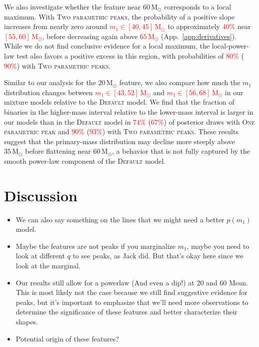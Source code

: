 \documentclass[twocolumn,twocolappendix,linenumbers]{aastex631}
\newcommand{\oneparpeak}{\textsc{One parametric peak}\xspace}
\newcommand{\twoparpeaks}{\textsc{Two parametric peaks}\xspace}
\newcommand{\Msun}{\ensuremath{\mathrm{M}_\odot}\xspace}
\begin{document}
We also investigate whether the feature near $60\,\Msun$ corresponds to a local maximum.
With \twoparpeaks, the probability of a positive slope increases from nearly zero around \textcolor{red}{$m_1 \in [40,45]\,\Msun$} to approximately \textcolor{red}{$40\%$} near \textcolor{red}{$[55,60]\,\Msun$}, before decreasing again above \textcolor{red}{$65\,\Msun$} (App.~\ref{app:derivatives}).
While we do not find conclusive evidence for a local maximum, the local-power-law test also favors a positive excess in this region, with probabilities of \textcolor{red}{$80\%$} (\textcolor{red}{$90\%$}) with \twoparpeaks.

Similar to our analysis for the $20\,\Msun$ feature, we also compare how much the $m_1$ distribution changes between \textcolor{red}{$m_1 \in [43,52]\,\Msun$} and \textcolor{red}{$m_1 \in [56,68]\,\Msun$} in our mixture models relative to the \textsc{Default} model.
We find that the fraction of binaries in the higher-mass interval relative to the lower-mass interval is larger in our models than in the \textsc{Default} model in \textcolor{red}{$74\%$} (\textcolor{red}{$67\%$}) of posterior draws with \oneparpeak and \textcolor{red}{$90\%$} (\textcolor{red}{$93\%$}) with \twoparpeaks.
These results suggest that the primary-mass distribution may decline more steeply above $35\,\Msun$ before flattening near $60\,\Msun$, a behavior that is not fully captured by the smooth power-law component of the \textsc{Default} model.


\section{Discussion}

\begin{itemize}
    \item We can also say something on the lines that we might need a better $p(m_1)$ model.
    \item Maybe the features are not peaks if you marginalize $m_1$, maybe you need to look at different $q$ to see peaks, as Jack did. But that's okay here since we look at the marginal.
    \item Our results still allow for a powerlaw (And even a dip!) at 20 and 60 Msun. This is most likely not the case because we still find suggestive evidence for peaks, but it's important to emphasize that we'll need more observations to determine the significance of these features and better characterize their shapes.
    \item Potential origin of these features?
\end{itemize}
\end{document}
